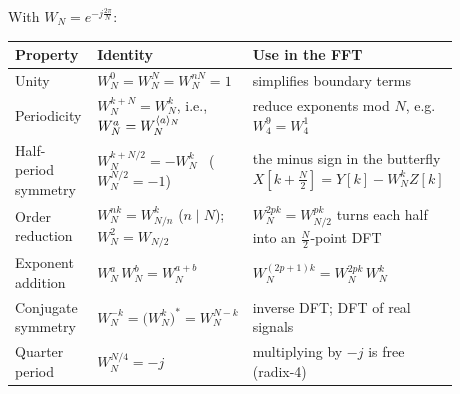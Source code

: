 With $W_N = e^{-j\frac{2\pi}{N}}$:\footnotemark
\begin{center}
\renewcommand{\arraystretch}{1.25}
\small
\begin{tabular}{@{}>{\raggedright}p{0.19\linewidth} >{\raggedright}p{0.35\linewidth} >{\raggedright\arraybackslash}p{0.34\linewidth}@{}}
\toprule
\textbf{Property} & \textbf{Identity} & \textbf{Use in the FFT} \\
\midrule
Unity & $W_N^0 = W_N^{N} = W_N^{nN} = 1$ & simplifies boundary terms \\
Periodicity & $W_N^{k+N} = W_N^{k}$, i.e., $W_N^{a} = W_N^{\langle a\rangle_{N}}$ & reduce exponents mod $N$, e.g.\ $W_4^9 = W_4^1$ \\
Half-period symmetry & $W_N^{k+N/2} = -W_N^{k}$ \ ($W_N^{N/2}=-1$) & the minus sign in the butterfly $X[k+\tfrac N2] = Y[k] - W_N^k Z[k]$ \\
Order reduction & $W_N^{nk} = W_{N/n}^{k}$ ($n \mid N$); \ $W_N^2 = W_{N/2}$ & $W_N^{2pk} = W_{N/2}^{pk}$ turns each half into an $\tfrac N2$-point DFT \\
Exponent addition & $W_N^{a}\,W_N^{b} = W_N^{a+b}$ & $W_N^{(2p+1)k} = W_N^{2pk}\,W_N^{k}$ \\
Conjugate symmetry & $W_N^{-k} = \big(W_N^{k}\big)^{*} = W_N^{N-k}$ & inverse DFT; DFT of real signals \\
Quarter period & $W_N^{N/4} = -j$ & multiplying by $-j$ is free (radix-4) \\
\bottomrule
\end{tabular}
\end{center}
